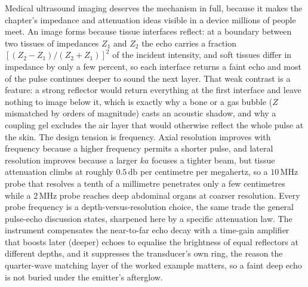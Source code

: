 Medical ultrasound imaging deserves the mechanism in full, because it makes
the chapter's impedance and attenuation ideas visible in a device millions
of people meet. An image forms because tissue interfaces reflect: at a
boundary between two tissues of impedances $Z_1$ and $Z_2$ the echo carries a
fraction $[(Z_2-Z_1)/(Z_2+Z_1)]^2$ of the incident intensity, and soft
tissues differ in impedance by only a few percent, so each interface returns
a faint echo and most of the pulse continues deeper to sound the next layer.
That weak contrast is a feature: a strong reflector would return everything
at the first interface and leave nothing to image below it, which is exactly
why a bone or a gas bubble ($Z$ mismatched by orders of magnitude) casts an
acoustic shadow, and why a coupling gel excludes the air layer that would
otherwise reflect the whole pulse at the skin. The design tension is
frequency. Axial resolution improves with frequency because a higher
frequency permits a shorter pulse, and lateral resolution improves because a
larger $ka$ focuses a tighter beam, but tissue attenuation climbs at roughly
$0.5\,\si{\decibel}$ per centimetre per megahertz, so a $10\,\si{\mega\hertz}$
probe that resolves a tenth of a millimetre penetrates only a few centimetres
while a $2\,\si{\mega\hertz}$ probe reaches deep abdominal organs at coarser
resolution. Every probe frequency is a depth-versus-resolution choice, the
same trade the general pulse-echo discussion states, sharpened here by a
specific attenuation law. The instrument compensates the near-to-far echo
decay with a time-gain amplifier that boosts later (deeper) echoes to
equalise the brightness of equal reflectors at different depths, and it
suppresses the transducer's own ring, the reason the quarter-wave matching
layer of the worked example matters, so a faint deep echo is not buried under
the emitter's afterglow.

